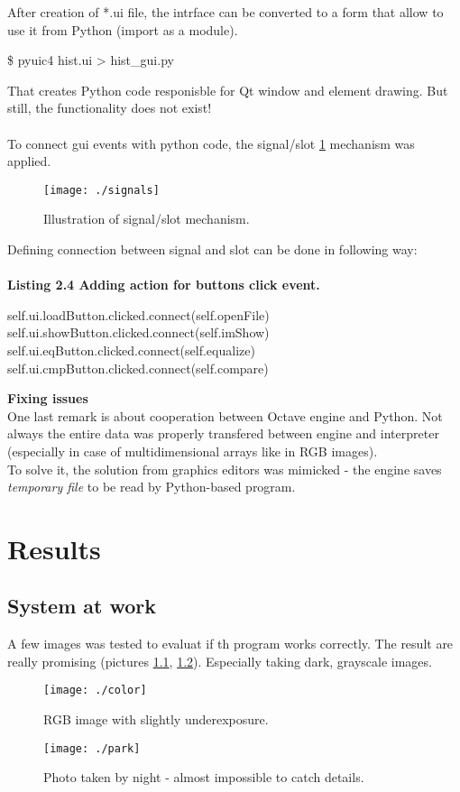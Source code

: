 \documentclass[eng,openany]{mgr}
\begin{document}
After creation of *.ui file, the intrface can be converted to a form that allow to use it from Python (import as a module).
\begin{python}
\$ pyuic4 hist.ui > hist_gui.py
\end{python}
\noindent
That creates Python code responisble for Qt window and element drawing. But still, the functionality does not exist!\\
\\
To connect gui events with python code, the signal/slot \ref{fig:signals} mechanism was applied.
\begin{figure}[h]
\centering
\texttt{[image: ./signals]}
\caption[h]{}
\caption{Illustration of signal/slot mechanism.}
\label{fig:signals}
\end{figure}
\newpage\noindent
Defining connection between signal and slot can be done in following way:
\\
\\
\textbf{Listing 2.4 Adding action for buttons click event.}
\begin{python}
        self.ui.loadButton.clicked.connect(self.openFile)
        self.ui.showButton.clicked.connect(self.imShow)
        self.ui.eqButton.clicked.connect(self.equalize)
        self.ui.cmpButton.clicked.connect(self.compare)
\end{python}
\vspace{30pt}
\textbf{Fixing issues}\\
One last remark is about cooperation between Octave engine and Python. Not always the entire data was properly transfered between engine and interpreter (especially in case of multidimensional arrays like in RGB images).\\
To solve it, the solution from graphics editors was mimicked - the engine saves \textit{temporary file} to be read by Python-based program.

\chapter{Results}
\section{System at work}
A few images was tested to evaluat if th program works correctly.
The result are really promising (pictures \ref{fig:color}, \ref{fig:park}). Especially taking dark, grayscale images.
\begin{figure}[h]
\centering
\texttt{[image: ./color]}
\caption{RGB image with slightly underexposure.}
\label{fig:color}
\end{figure}
\begin{figure}[h]
\centering
\texttt{[image: ./park]}
\caption{Photo taken by night - almost impossible to catch details.}
\label{fig:park}
\end{figure}
\newpage
\end{document}
